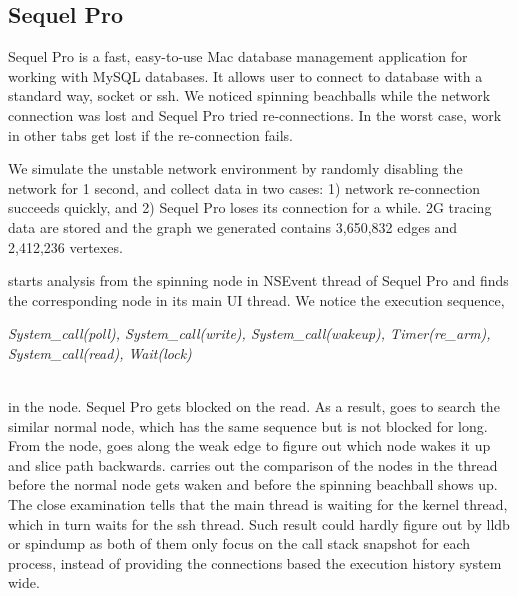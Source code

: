 \subsection{Sequel Pro}

Sequel Pro is a fast, easy-to-use Mac database management application for
working with MySQL databases. It allows user to connect to database with a
standard way, socket or ssh. We noticed spinning beachballs while the network
connection was lost and Sequel Pro tried re-connections. In the worst case, work
in other tabs get lost if the re-connection fails.

We simulate the unstable network environment by randomly disabling the network
for 1 second, and collect data in two cases: 1) network re-connection
succeeds quickly, and 2) Sequel Pro loses its connection for a while. 2G
tracing data are stored and the graph we generated contains 3,650,832 edges and
2,412,236 vertexes.

\xxx starts analysis from the spinning node in NSEvent thread of Sequel Pro and
finds the corresponding node in its main UI thread. We notice the execution
sequence,\\ \centerline{\textit{System\_call(poll), System\_call(write), System\_call(wakeup), Timer(re\_arm), System\_call(read), Wait(lock)}} \\
in the node. Sequel Pro gets blocked on the read. As a result, \xxx goes to
search the similar normal node, which has the same sequence but is not blocked
for long. From the node, \xxx goes along the weak edge to figure out which node
wakes it up and slice path backwards. \xxx carries out the comparison of the
nodes in the thread before the normal node gets waken and before the spinning
beachball shows up. The close examination tells that the main thread is waiting
for the kernel thread, which in turn waits for the ssh thread. Such result
could hardly figure out by lldb or spindump as both of them only focus on the
call stack snapshot for each process, instead of providing the connections based
the execution history system wide.

